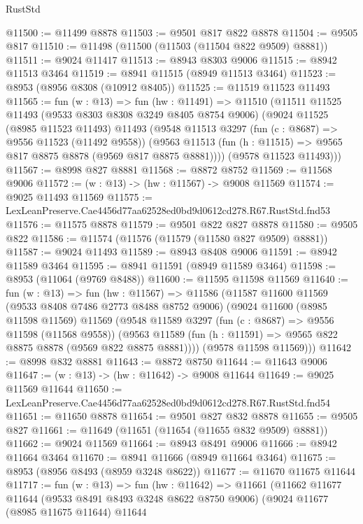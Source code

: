 \begin{lexlean}{RustStd}
\begin{coremodule}
@11500 := @11499 @8878
@11503 := @9501 @817 @822 @8878
@11504 := @9505 @817
@11510 := @11498 (@11500 (@11503 (@11504 @822 @9509) @8881))
@11511 := @9024 @11417
@11513 := @8943 @8303 @9006
@11515 := @8942 @11513 @3464
@11519 := @8941 @11515 (@8949 @11513 @3464)
@11523 := @8953 (@8956 @8308 (@10912 @8405))
@11525 := @11519 @11523 @11493
@11565 := fun (w : @13) =>
  fun (hw : @11491) =>
  @11510
    (@11511
      @11525
      @11493
      (@9533 @8303 @8308 @3249 @8405 @8754 @9006)
      (@9024
        @11525
        (@8985 @11523 @11493)
        @11493
        (@9548
          @11513
          @3297
          (fun (c : @8687) => @9556 @11523 (@11492 @9558))
          (@9563 @11513 (fun (h : @11515) => @9565 @817 @8875 @8878 (@9569 @817 @8875 @8881))))
        (@9578 @11523 @11493)))
@11567 := @8998 @827 @8881
@11568 := @8872 @8752
@11569 := @11568 @9006
@11572 := (w : @13) -> (hw : @11567) -> @9008 @11569
@11574 := @9025 @11493 @11569
@11575 := LexLeanPreserve.Cae4456d77aa62528ed0bd9d0612cd278.R67.RustStd.fnd53
@11576 := @11575 @8878
@11579 := @9501 @822 @827 @8878
@11580 := @9505 @822
@11586 := @11574 (@11576 (@11579 (@11580 @827 @9509) @8881))
@11587 := @9024 @11493
@11589 := @8943 @8408 @9006
@11591 := @8942 @11589 @3464
@11595 := @8941 @11591 (@8949 @11589 @3464)
@11598 := @8953 (@11064 (@9769 @8488))
@11600 := @11595 @11598 @11569
@11640 := fun (w : @13) =>
  fun (hw : @11567) =>
  @11586
    (@11587
      @11600
      @11569
      (@9533 @8408 @7486 @2773 @8488 @8752 @9006)
      (@9024
        @11600
        (@8985 @11598 @11569)
        @11569
        (@9548
          @11589
          @3297
          (fun (c : @8687) => @9556 @11598 (@11568 @9558))
          (@9563 @11589 (fun (h : @11591) => @9565 @822 @8875 @8878 (@9569 @822 @8875 @8881))))
        (@9578 @11598 @11569)))
@11642 := @8998 @832 @8881
@11643 := @8872 @8750
@11644 := @11643 @9006
@11647 := (w : @13) -> (hw : @11642) -> @9008 @11644
@11649 := @9025 @11569 @11644
@11650 := LexLeanPreserve.Cae4456d77aa62528ed0bd9d0612cd278.R67.RustStd.fnd54
@11651 := @11650 @8878
@11654 := @9501 @827 @832 @8878
@11655 := @9505 @827
@11661 := @11649 (@11651 (@11654 (@11655 @832 @9509) @8881))
@11662 := @9024 @11569
@11664 := @8943 @8491 @9006
@11666 := @8942 @11664 @3464
@11670 := @8941 @11666 (@8949 @11664 @3464)
@11675 := @8953 (@8956 @8493 (@8959 @3248 @8622))
@11677 := @11670 @11675 @11644
@11717 := fun (w : @13) =>
  fun (hw : @11642) =>
  @11661
    (@11662
      @11677
      @11644
      (@9533 @8491 @8493 @3248 @8622 @8750 @9006)
      (@9024
        @11677
        (@8985 @11675 @11644)
        @11644

\end{coremodule}
\end{lexlean}

